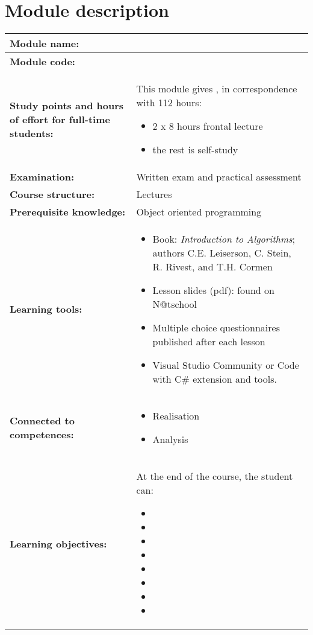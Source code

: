 \section*{Module description}
\begin{tabularx}{\textwidth}{|>{\columncolor{lichtGrijs}} p{}|X|}
	\hline
	\textbf{Module name:} & \modulenaam\\
	\hline
	\textbf{Module code: }& \modulecode\\
	\hline
	\textbf{Study points \newline and hours of effort for full-time students:} & This module gives \stdPunten, in correspondence with 112 hours:
	\begin{itemize}
		\item 2 x 8 hours frontal lecture
		\item the rest is self-study
	\end{itemize} \\
	\hline
	\textbf{Examination:} & Written exam and practical assessment \\
	\hline
	\textbf{Course structure:} & Lectures \\
	\hline
	\textbf{Prerequisite knowledge:} & Object oriented programming \\
	\hline
	\textbf{Learning tools:} & \begin{itemize}
			\item Book: \textit{Introduction to Algorithms}; authors
			C.E. Leiserson, C. Stein, R. Rivest, and T.H. Cormen
			\item Lesson slides (pdf): found on N@tschool
			\item Multiple choice questionnaires published after each lesson
			\item Visual Studio Community or Code with C\# extension and tools.
		\end{itemize} \\
	\hline
	\textbf{Connected to \newline competences:} & \begin{itemize}
			\item Realisation
			\item Analysis
		\end{itemize} \\
	\hline
	\textbf{Learning objectives:} &
		At the end of the course, the student can:
			\begin{itemize}
				\item \lga
				\item \lgb
				\item \lgc
				\item \lgd
				\item \lge 
				\item \lgf
				\item \lgg
				\item \lgh
			\end{itemize} \\
	\hline


\end{tabularx}
